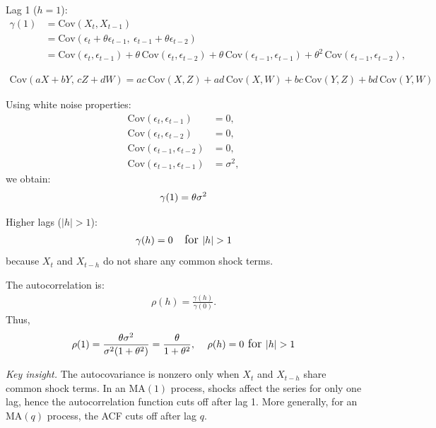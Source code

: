 \documentclass[10pt,a4paper]{article}
\begin{document}
	Lag 1 ($h=1$):
	\begin{align*}
	\gamma(1) &= \text{Cov}(X_t, X_{t-1}) \\
	&= \text{Cov}(\epsilon_t + \theta \epsilon_{t-1}, \ \epsilon_{t-1} + \theta \epsilon_{t-2}) \\
	&= \text{Cov}(\epsilon_t, \epsilon_{t-1}) + \theta\,\text{Cov}(\epsilon_t, \epsilon_{t-2}) + \theta\,\text{Cov}(\epsilon_{t-1}, \epsilon_{t-1}) + \theta^2\,\text{Cov}(\epsilon_{t-1}, \epsilon_{t-2}),
	\end{align*}
	
	\begin{align*}
	\mathrm{Cov}(aX + bY,\, cZ + dW) = ac\,\mathrm{Cov}(X,Z) + ad\,\mathrm{Cov}(X,W) + bc\,\mathrm{Cov}(Y,Z) + bd\,\mathrm{Cov}(Y,W)
	\end{align*}
	
	
	
	Using white noise properties:
	\begin{align*}
	\text{Cov}(\epsilon_t, \epsilon_{t-1}) &= 0, \\
	\text{Cov}(\epsilon_t, \epsilon_{t-2}) &= 0, \\
	\text{Cov}(\epsilon_{t-1}, \epsilon_{t-2}) &= 0, \\
	\text{Cov}(\epsilon_{t-1}, \epsilon_{t-1}) &= \sigma^2,
	\end{align*}
	we obtain:
	\begin{align*}
	\large \gamma(1) = \theta \sigma^2
	\end{align*}
	
	
	Higher lags ($|h|>1$):
	\begin{align*}
	\large \gamma(h) = 0 \quad \text{for } |h| > 1
	\end{align*}
	because $X_t$ and $X_{t-h}$ do not share any common shock terms.
	
	
	The autocorrelation is:
	\begin{align*}
	\rho(h) = \frac{\gamma(h)}{\gamma(0)}.
	\end{align*}
	Thus,
	\begin{align*}
	\large \rho(1) = \frac{\theta \sigma^2}{\sigma^2(1+\theta^2)} = \frac{\theta}{1+\theta^2},
	\quad \rho(h)=0 \text{ for } |h|>1
	\end{align*}
	
	\textit{Key insight.} The autocovariance is nonzero only when $X_t$ and $X_{t-h}$ share common shock terms. In an MA$(1)$ process, shocks affect the series for only one lag, hence the autocorrelation function cuts off after lag 1. More generally, for an MA$(q)$ process, the ACF cuts off after lag $q$.
	
\end{document}
